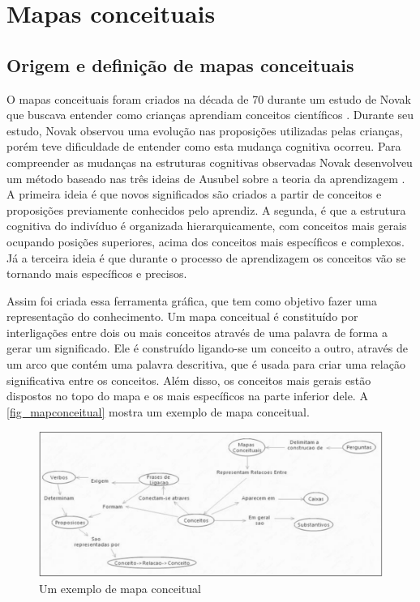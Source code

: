 \documentclass[
	12pt,				%
	openright,			%
	oneside,			%
	a4paper,			%
	english,			%
	french,				%
	spanish,			%
	brazil				%
	]{abntex2}
\begin{document}
\chapter{Mapas conceituais}
\section{Origem e definição de mapas conceituais}
O mapas conceituais foram criados na década de 70 durante um estudo de Novak que buscava entender como crianças aprendiam conceitos científicos \cite{Novak2005}. Durante seu estudo, Novak observou uma evolução nas proposições utilizadas pelas crianças, porém teve dificuldade de entender como esta mudança cognitiva ocorreu. Para compreender as mudanças na estruturas cognitivas observadas Novak desenvolveu um método baseado nas três ideias de Ausubel sobre a teoria da aprendizagem \cite{ausubel1963}. A primeira ideia é que novos significados são criados a partir de conceitos e proposições previamente conhecidos pelo aprendiz. A segunda, é que a estrutura cognitiva do indivíduo é organizada hierarquicamente, com conceitos mais gerais ocupando posições superiores, acima dos conceitos mais específicos e complexos. Já a terceira ideia é que durante o processo de aprendizagem os conceitos vão se tornando mais específicos e precisos.

Assim foi criada essa ferramenta gráfica, que tem como objetivo fazer uma representação do conhecimento. Um mapa conceitual é constituído por interligações entre dois ou mais conceitos através de uma palavra de forma a gerar um significado. Ele é construído ligando-se um conceito a outro, através de um arco que contém uma palavra descritiva, que é usada para criar uma relação significativa entre os conceitos. Além disso, os conceitos mais gerais estão dispostos no topo do mapa e os mais específicos na parte inferior dele. A \autoref{fig_mapconceitual} mostra um exemplo de mapa conceitual.
\begin{figure}[htb]
	\caption{\label{fig_mapconceitual}Um exemplo de mapa conceitual}
	\begin{center}
		\includegraphics[scale=0.3]{mapaconceitual.png}
	\end{center}
\end{figure}
\end{document}
